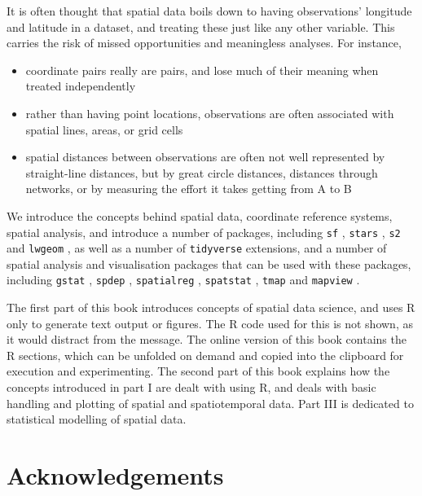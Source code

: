 \documentclass[]{book}
\providecommand{\tightlist}{%
  \setlength{\itemsep}{0pt}\setlength{\parskip}{0pt}}
\begin{document}
It is often thought that spatial data boils down to having
observations' longitude and latitude in a dataset, and treating these
just like any other variable. This carries the risk of missed
opportunities and meaningless analyses. For instance,

\begin{itemize}
\tightlist
\item
  coordinate pairs really are pairs, and lose much of their meaning
  when treated independently
\item
  rather than having point locations, observations are often
  associated with spatial lines, areas, or grid cells
\item
  spatial distances between observations are often not well
  represented by straight-line distances, but by great circle
  distances, distances through networks, or by measuring the effort
  it takes getting from A to B
\end{itemize}

We introduce the concepts behind spatial data, coordinate reference
systems, spatial analysis, and introduce a number of packages,
including \texttt{sf} \citep{rjsf, R-sf}, \texttt{stars} \citep{R-stars}, \texttt{s2} \citep{R-s2}
and \texttt{lwgeom} \citep{R-lwgeom},
as well as a number of \texttt{tidyverse} \citep{R-tidyverse} extensions, and a number of
spatial analysis and visualisation packages that can be used with these packages,
including \texttt{gstat} \citep{R-gstat}, \texttt{spdep} \citep{R-spdep}, \texttt{spatialreg} \citep{R-spatialreg}, \texttt{spatstat} \citep{R-spatstat},
\texttt{tmap} \citep{R-tmap} and \texttt{mapview} \citep{R-mapview}.

The first part of this book introduces concepts of spatial data science,
and uses R only to generate text output or figures. The R code used for
this is not shown, as it would distract from the message. The online
version of this book contains the R sections, which can be unfolded
on demand and copied into the clipboard for execution and experimenting.
The second part of this book explains how the concepts introduced in
part I are dealt with using R, and deals with basic handling and plotting
of spatial and spatiotemporal data. Part III is dedicated to statistical
modelling of spatial data.

\hypertarget{acknowledgements}{%
\section{Acknowledgements}\label{acknowledgements}}
\end{document}
